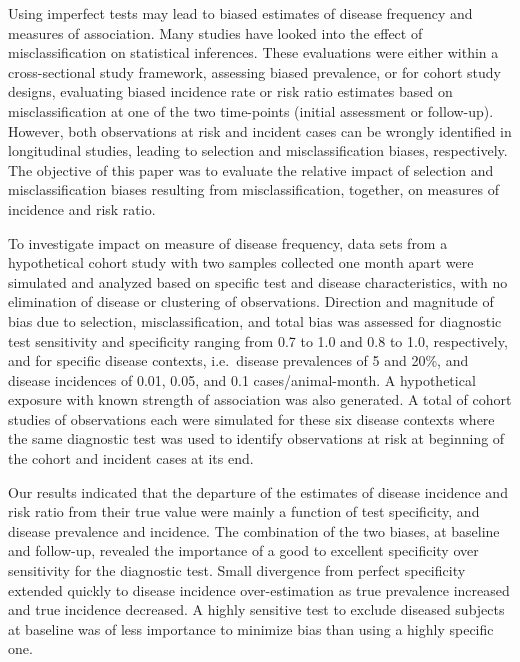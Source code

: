 Using imperfect tests may lead to biased estimates of disease frequency and
measures of association.
Many studies have looked into the effect of misclassification on statistical
inferences.
These evaluations were either within a cross-sectional study framework,
assessing biased prevalence, or for cohort study designs, evaluating biased
incidence rate or risk ratio estimates based on misclassification at one
of the two time-points (initial assessment or follow-up).
However, both observations at risk and incident cases can be wrongly
identified in longitudinal studies, leading to selection and misclassification
biases, respectively.
The objective of this paper was to evaluate the relative impact of selection
and misclassification biases resulting from misclassification, together, on
measures of incidence and risk ratio.

To investigate impact on measure of disease frequency, data sets from a
hypothetical cohort study with two samples collected one month apart were
simulated and analyzed based on specific test and disease characteristics, with
no elimination of disease or clustering of observations.
Direction and magnitude of bias due to selection, misclassification, and total
bias was assessed for diagnostic test sensitivity and specificity ranging from
0.7 to 1.0 and 0.8 to 1.0, respectively, and for specific disease contexts,
i.e.\ disease prevalences of 5 and 20\%, and disease incidences of 0.01, 0.05,
and 0.1 cases/animal-month.
A hypothetical exposure with known strength of association
was also generated.
A total of  cohort studies of  observations each
were simulated for these six disease contexts where the same diagnostic test
was used to identify observations at risk at beginning of the cohort and
incident cases at its end.

Our results indicated that the departure of the estimates of disease incidence
and risk ratio from their true value were mainly a function of test
specificity, and disease prevalence and incidence.
The combination of the two biases, at baseline and follow-up, revealed the
importance of a good to excellent specificity over sensitivity for the
diagnostic test.
Small divergence from perfect specificity extended quickly to disease
incidence over-estimation as true prevalence increased and true incidence
decreased.
A highly sensitive test to exclude diseased subjects at baseline was of less
importance to minimize bias than using a highly specific one.

